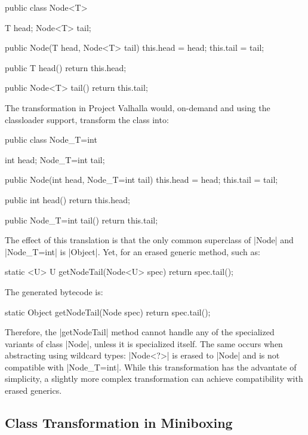 \begin{lstlisting-nobreak}
 public class Node<T> {
   T head;
   Node<T> tail;

   public Node(T head, Node<T> tail) {
     this.head = head;
     this.tail = tail;
   }

   public T head() {
     return this.head;
   }

   public Node<T> tail() {
     return this.tail;
   }
 }
\end{lstlisting-nobreak}

The transformation in Project Valhalla would, on-demand and using the classloader support, transform the class into:

\begin{lstlisting-nobreak}
 public class Node_{T=int} {
   int head;
   Node_{T=int} tail;

   public Node(int head, Node_{T=int} tail) {
     this.head = head;
     this.tail = tail;
   }

   public int head() {
     return this.head;
   }

   public Node_{T=int} tail() {
     return this.tail;
   }
 }
\end{lstlisting-nobreak}

The effect of this translation is that the only common superclass of |Node| and |Node_{T=int}| is |Object|. Yet, for an erased generic method, such as:

\begin{lstlisting-nobreak}
static <U> U getNodeTail(Node<U> spec) {
  return spec.tail();
}
\end{lstlisting-nobreak}

The generated bytecode is:

\begin{lstlisting-nobreak}
static Object getNodeTail(Node spec) {
  return spec.tail();
}
\end{lstlisting-nobreak}

Therefore, the |getNodeTail| method cannot handle any of the specialized variants of class |Node|, unless it is specialized itself. The same occurs when abstracting using wildcard types: |Node<?>| is erased to |Node| and is not compatible with |Node_{T=int}|. While this transformation has the advantate of simplicity, a slightly more complex transformation can achieve compatibility with erased generics.

\subsection{Class Transformation in Miniboxing}

